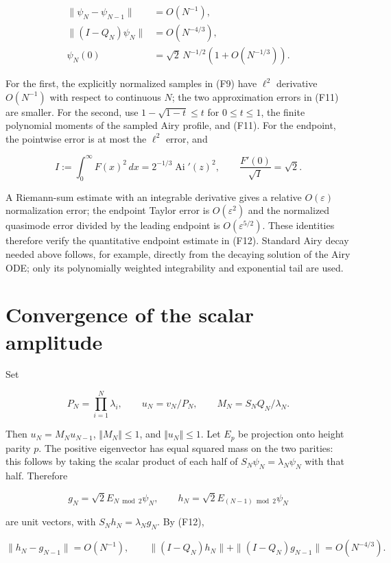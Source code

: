 \documentclass[11pt,letterpaper]{article}
\numberwithin{equation}{section}
\theoremstyle{remark}
\begin{document}
\[
\begin{aligned}
\|\psi_N-\psi_{N-1}\|&=O(N^{-1}),\\
\|(I-Q_N)\psi_N\|&=O(N^{-4/3}),\\
\psi_N(0)&=\sqrt2\,N^{-1/2}(1+O(N^{-1/3})).
\end{aligned}
\tag{F12}
\]

For the first, the explicitly normalized samples in (F9) have \(\ell ^2\) derivative \(O(N^{-1})\) with respect to continuous \(N\); the two approximation errors in (F11) are smaller. For the second, use \(1-\sqrt{1-t}\le t\) for \(0\le t\le 1\), the finite polynomial moments of the sampled Airy profile, and (F11). For the endpoint, the pointwise error is at most the \(\ell ^2\) error, and

\[
I:=\int_0^\infty F(x)^2\,dx=2^{-1/3}\operatorname{Ai}'(z)^2,
\qquad \frac{F'(0)}{\sqrt I}=\sqrt2.
\]

A Riemann-sum estimate with an integrable derivative gives a relative \(O(\varepsilon )\) normalization error; the endpoint Taylor error is \(O(\varepsilon ^2)\) and the normalized quasimode error divided by the leading endpoint is \(O(\varepsilon ^{5/2})\). These identities therefore verify the quantitative endpoint estimate in (F12). Standard Airy decay needed above follows, for example, directly from the decaying solution of the Airy ODE; only its polynomially weighted integrability and exponential tail are used.

\section{Convergence of the scalar amplitude}\label{air:rb:convergence-of-the-scalar-amplitude}

Set

\[
P_N=\prod_{i=1}^N\lambda_i,\qquad
u_N=v_N/P_N,\qquad M_N=S_NQ_N/\lambda_N.
\]

Then \(u_N=M_Nu_{N-1}\), \(\Vert M_N\Vert \le 1\), and \(\Vert u_N\Vert \le 1\). Let \(E_p\) be projection onto height parity \(p\). The positive eigenvector has equal squared mass on the two parities: this follows by taking the scalar product of each half of \(S_N\psi _N=\lambda _N\psi _N\) with that half. Therefore

\[
g_N=\sqrt2 E_{N\bmod2}\psi_N,\qquad
h_N=\sqrt2 E_{(N-1)\bmod2}\psi_N
\]

are unit vectors, with \(S_Nh_N=\lambda _Ng_N\). By (F12),

\[
\|h_N-g_{N-1}\|=O(N^{-1}),\qquad
\|(I-Q_N)h_N\|+\|(I-Q_N)g_{N-1}\|=O(N^{-4/3}).
\tag{F13}
\]
\end{document}
